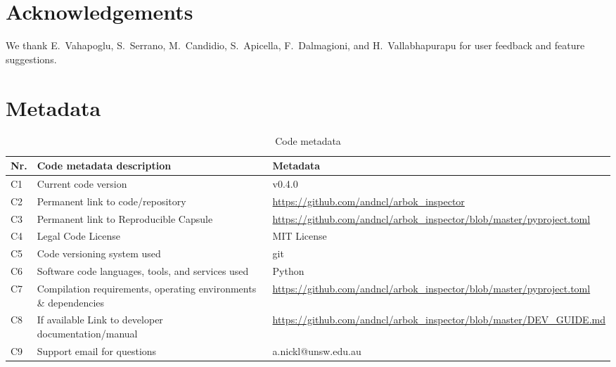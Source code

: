 \documentclass[preprint,12pt]{elsarticle}
\begin{document}


\section*{Acknowledgements}

We thank E.~Vahapoglu, S.~Serrano, M.~Candidio, S.~Apicella, F.~Dalmagioni, and H.~Vallabhapurapu for user feedback and feature suggestions.


\section*{Metadata}

\begin{table}[H]
\centering
\begin{tabular}{p{} p{} p{}}
\toprule
\textbf{Nr.} & \textbf{Code metadata description} & \textbf{Metadata} \\
\midrule
C1 & Current code version & v0.4.0 \\
C2 & Permanent link to code/repository & \url{https://github.com/andncl/arbok_inspector} \\
C3 & Permanent link to Reproducible Capsule & \url{https://github.com/andncl/arbok_inspector/blob/master/pyproject.toml} \\
C4 & Legal Code License & MIT License \\
C5 & Code versioning system used & git \\
C6 & Software code languages, tools, and services used & Python \\
C7 & Compilation requirements, operating environments \& dependencies & \url{https://github.com/andncl/arbok_inspector/blob/master/pyproject.toml} \\
C8 & If available Link to developer documentation/manual & \url{https://github.com/andncl/arbok_inspector/blob/master/DEV_GUIDE.md} \\
C9 & Support email for questions & a.nickl@unsw.edu.au \\
\bottomrule
\end{tabular}
\caption{Code metadata}
\label{tab:inspector_metadata}
\end{table}
\end{document}
